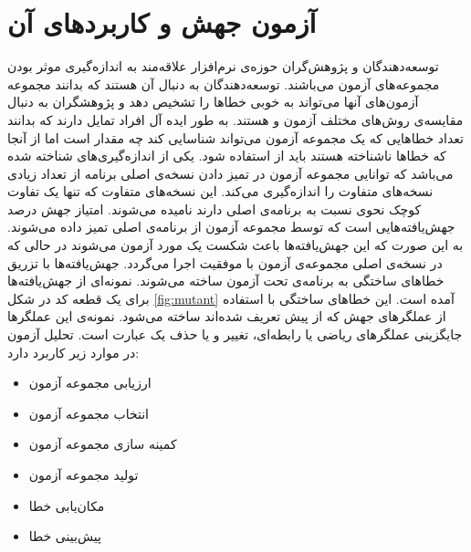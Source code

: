 \section{آزمون جهش و کاربردهای آن}
\label{sec:mutation}
توسعه‌دهندگان و پژوهش‌گران حوزه‌ی نرم‌افزار علاقه‌مند به اندازه‌گیری موثر بودن مجموعه‌های آزمون می‌باشند. توسعه‌دهندگان به دنبال آن هستند که بدانند مجموعه آزمون‌های آنها می‌تواند به خوبی خطاها را تشخیص دهد و پژوهشگران به دنبال مقایسه‌ی روش‌های مختلف آزمون و   هستند. به طور ایده آل افراد تمایل دارند که بدانند تعداد خطاهایی که یک مجموعه آزمون می‌تواند شناسایی کند چه مقدار است اما از آنجا که خطاها ناشناخته هستند باید از  استفاده شود. یکی از اندازه‌‌‌گیری‌های شناخته شده  می‌باشد که توانایی مجموعه آزمون در تمیز دادن نسخه‌ی اصلی برنامه از تعداد زیادی نسخه‌های متفاوت را اندازه‌گیری می‌کند. این نسخه‌های متفاوت که تنها یک تفاوت کوچک نحوی نسبت به برنامه‌ی اصلی دارند  نامیده می‌شوند. امتیاز جهش درصد جهش‌یافته‌هایی  است که توسط مجموعه آزمون از برنامه‌ی اصلی تمیز داده می‌شوند. به این صورت که این جهش‌یافته‌ها باعث شکست یک مورد آزمون می‌شوند در حالی که در نسخه‌ی اصلی مجموعه‌ی آزمون با موفقیت اجرا می‌گردد. جهش‌یافته‌ها با تزریق خطاهای ساختگی به برنامه‌ی تحت آزمون  ساخته می‌شوند.  نمونه‌ای از  جهش‌یافته‌ها  برای یک قطعه کد در شکل \ref{fig:mutant} آمده است. این خطاهای ساختگی با استفاده از عملگرهای جهش که از پیش تعریف شده‌اند ساخته می‌شود. نمونه‌ی این عملگرها جایگزینی عملگرهای ریاضی یا رابطه‌ای، تغییر  و یا حذف یک عبارت است\cite{just2014mutants}. تحلیل آزمون در موارد زیر کاربرد دارد:
\begin{itemize}
	\setlength\itemsep{.01em}	
	\item 
	ارزیابی مجموعه آزمون
	\item 
	انتخاب مجموعه آزمون
	\item 
	 کمینه سازی مجموعه آزمون
	\item 
	 تولید مجموعه آزمون
	\item 
	مکان‌یابی خطا
	\item 
	پیش‌بینی خطا
\end{itemize}

